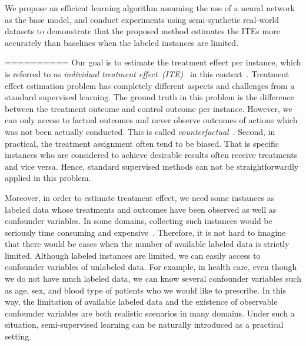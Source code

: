 We propose an efficient learning algorithm assuming the use of a neural network as the base model, and conduct experiments using semi-synthetic real-world datasets to demonstrate that the proposed method estimates the ITEs more accurately than baselines when the labeled instances are limited.


==========
Our goal is to estimate the treatment effect per instance, which is referred to as {\it individual treatment effect~(ITE)~} in this context~\cite{rubin1974estimating}. %
Treatment effect estimation problem has completely different aspects and challenges from a standard supervised learning. The ground truth in this problem is the difference between the treatment outcome and control outcome per instance. However, we can only access to factual outcomes and never observe outcomes of  actions which was not been actually conducted. This is called {\it counterfactual}~\cite{lewis1974causation,pearl2009causality,rubin1974estimating}.  Second, in practical, the treatment assignment often tend to be biased. That is specific instances who are considered to achieve desirable results often receive treatments and vice versa. Hence, standard supervised methods can not be straightforwardly applied in this problem. 

Moreover, in order to estimate treatment effect, we need some instances as labeled data whose treatments and outcomes have been observed as well as confounder variables. In some domains,  collecting such instances would be seriously time consuming and expensive~\cite{radlinski2005query,pombo2015machine}. Therefore, it is not hard to imagine that there would be cases when the number of available labeled data is strictly limited. Although labeled instances are limited, we can easily access to confounder variables of unlabeled data. For example, in health care, even though we do not have much labeled data, we can know several confounder variables such as age, sex, and blood type of patients who we would like to prescribe. In this way, the limitation of available labeled data and the existence of observable confounder variables are both realistic scenarios in many domains. Under such a situation, semi-supervised learning can be naturally introduced as a practical setting.





